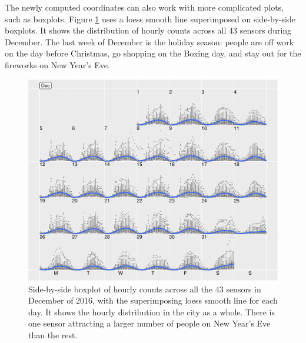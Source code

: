 \documentclass[article]{jss}
\theoremstyle{definition}
\theoremstyle{definition}
\theoremstyle{remark}
\begin{document}
The newly computed coordinates can also work with more complicated
plots, such as boxplots. Figure \ref{fig:boxplot} uses a loess smooth
line superimposed on side-by-side boxplots. It shows the distribution of
hourly counts across all 43 sensors during December. The last week of
December is the holiday season: people are off work on the day before
Christmas, go shopping on the Boxing day, and stay out for the fireworks
on New Year's Eve.

\begin{CodeChunk}
\begin{figure}

{\centering \includegraphics[width=\textwidth]{figure/boxplot-1} 

}

\caption[Side-by-side boxplot of hourly counts across all the
43 sensors in December of 2016, with the superimposing loess smooth line
for each day. It shows the hourly distribution in the city as a whole.
There is one sensor attracting a larger number of people on New Year's
Eve than the rest.]{Side-by-side boxplot of hourly counts across all the
43 sensors in December of 2016, with the superimposing loess smooth line
for each day. It shows the hourly distribution in the city as a whole.
There is one sensor attracting a larger number of people on New Year's
Eve than the rest.}\label{fig:boxplot}
\end{figure}
\end{CodeChunk}
\end{document}
